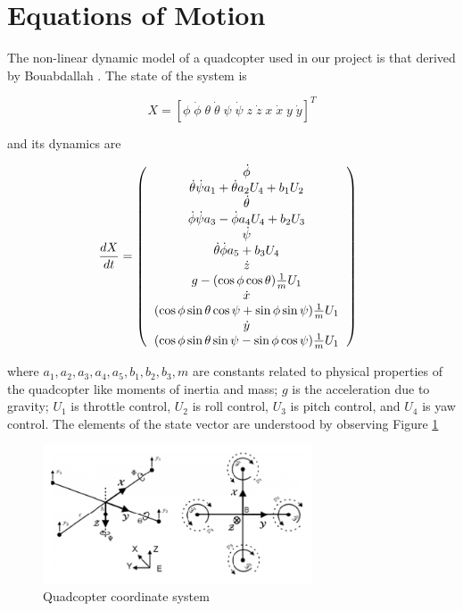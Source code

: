 \section{Equations of Motion \label{sec:eom}}
The non-linear dynamic model of a quadcopter used in our project is that derived by Bouabdallah \cite{bouabdallah2007design}. The state of the system is

\begin{equation}
X = \left[\phi \; \dot{\phi} \; \theta \; \dot{\theta} \; \psi \; \dot{\psi} \; z \; \dot{z} \; x \; \dot{x} \; y \; \dot{y}
\right]^T
\end{equation}

and its dynamics are

\begin{equation}\label{eq:eom}
\frac{d X}{d t} = \left(
\begin{tabular}{c}
$\dot{\phi}$\\
$\dot{\theta}\dot{\psi}a_1 + \dot{\theta}a_2 U_4 + b_1 U_2$\\
$\dot{\theta}$\\
$\dot{\phi}\dot{\psi}a_3 - \dot{\phi}a_4 U_4 + b_2 U_3$\\
$\dot{\psi}$\\
$\dot{\theta}\dot{\phi}a_5 + b_3 U_4$\\
$\dot{z}$\\
$g - (\cos{\phi}\cos{\theta})\frac{1}{m}U_1$\\
$\dot{x}$\\
$(\cos{\phi}\sin{\theta}\cos{\psi} + \sin{\phi}\sin{\psi})\frac{1}{m}U_1$\\
$\dot{y}$\\
$(\cos{\phi}\sin{\theta}\sin{\psi} - \sin{\phi}\cos{\psi})\frac{1}{m}U_1$
\end{tabular}
\right) \;\; 
\end{equation}

where $a_1, a_2, a_3, a_4, a_5, b_1, b_2, b_3, m$ are constants related to physical properties of the quadcopter like moments of inertia and mass; $g$ is the acceleration due to gravity; $U_1$ is throttle control, $U_2$ is roll control, $U_3$ is pitch control, and $U_4$ is yaw control. The elements of the state vector are understood by observing Figure \ref{fig:coord_system}

\begin{figure}[h]
\centering
\includegraphics[width=8cm]{coordinate_system.png}
\caption{Quadcopter coordinate system  \cite{bouabdallah2007design}}
\label{fig:coord_system}
\end{figure}

